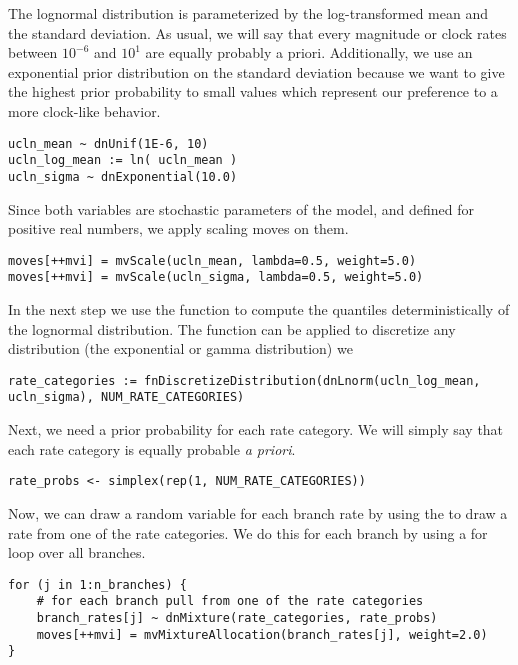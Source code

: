 The lognormal distribution is parameterized by the log-transformed mean and the standard deviation.
As usual, we will say that every magnitude or clock rates between $10^{-6}$ and $10^{1}$ are equally probably a priori.
Additionally, we use an exponential prior distribution on the standard deviation because we want to give the highest prior probability to small values which represent our preference to a more clock-like behavior.
{\tt \begin{snugshade*}
\begin{lstlisting}
ucln_mean ~ dnUnif(1E-6, 10)
ucln_log_mean := ln( ucln_mean )
ucln_sigma ~ dnExponential(10.0)
\end{lstlisting}
\end{snugshade*}}
Since both variables are stochastic parameters of the model, and defined for positive real numbers, we apply scaling moves on them.
{\tt \begin{snugshade*}
\begin{lstlisting}moves[++mvi] = mvScale(ucln_mean, lambda=0.5, weight=5.0)
moves[++mvi] = mvScale(ucln_sigma, lambda=0.5, weight=5.0)
\end{lstlisting}
\end{snugshade*}}
In the next step we use the function  to compute the quantiles deterministically of the lognormal distribution.
The  function can be applied to discretize any distribution (\EG the exponential or gamma distribution) we
{\tt \begin{snugshade*}
\begin{lstlisting}
rate_categories := fnDiscretizeDistribution(dnLnorm(ucln_log_mean, ucln_sigma), NUM_RATE_CATEGORIES)
\end{lstlisting}
\end{snugshade*}}
Next, we need a prior probability for each rate category.
We will simply say that each rate category is equally probable \emph{a priori}.
{\tt \begin{snugshade*}
\begin{lstlisting}
rate_probs <- simplex(rep(1, NUM_RATE_CATEGORIES))
\end{lstlisting}
\end{snugshade*}}
Now, we can draw a random variable for each branch rate by using the  to draw a rate from one of the rate categories.
We do this for each branch by using a for loop over all branches.
{\tt \begin{snugshade*}
\begin{lstlisting}
for (j in 1:n_branches) {
    # for each branch pull from one of the rate categories
    branch_rates[j] ~ dnMixture(rate_categories, rate_probs)
    moves[++mvi] = mvMixtureAllocation(branch_rates[j], weight=2.0)
}
\end{lstlisting}
\end{snugshade*}}
